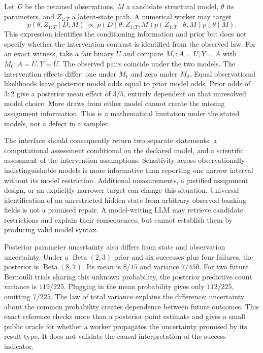 Let $D$ be the retained observations, $M$ a candidate structural model, $\theta$ its parameters, and $Z_{1:T}$ a latent-state path. A numerical worker may target
\[
 p(\theta,Z_{1:T}\mid D,M)
 \ \propto\ p(D\mid\theta,Z_{1:T},M)
 p(Z_{1:T}\mid\theta,M)p(\theta\mid M).
\]
This expression identifies the conditioning information and prior but does not specify whether the intervention contrast is identified from the observed law. For an exact witness, take a fair binary $U$ and compare $M_1:A=U,Y=A$ with $M_0:A=U,Y=U$. The observed pairs coincide under the two models. The intervention effects differ: one under $M_1$ and zero under $M_0$. Equal observational likelihoods leave posterior model odds equal to prior model odds. Prior odds of $3:2$ give a posterior mean effect of $3/5$, entirely dependent on that unresolved model choice. More draws from either model cannot create the missing assignment information. This is a mathematical limitation under the stated models, not a defect in a sampler.~\citep{exec23_pymc_reference,exec25_bsw_choice}

The interface should consequently return two separate statements: a computational assessment conditional on the declared model, and a scientific assessment of the intervention assumptions. Sensitivity across observationally indistinguishable models is more informative than reporting one narrow interval without its model restriction. Additional measurements, a justified assignment design, or an explicitly narrower target can change this situation. Universal identification of an unrestricted hidden state from arbitrary observed banking fields is not a promised repair. A model-writing LLM may retrieve candidate restrictions and explain their consequences, but cannot establish them by producing valid model syntax.~\citep{exec23_numpyro_reference,exec24_bnlearn_contract,exec25_bsw_choice}

Posterior parameter uncertainty also differs from state and observation uncertainty. Under a $\operatorname{Beta}(2,3)$ prior and six successes plus four failures, the posterior is $\operatorname{Beta}(8,7)$. Its mean is $8/15$ and variance $7/450$. For two future Bernoulli trials sharing this unknown probability, the posterior predictive count variance is $119/225$. Plugging in the mean probability gives only $112/225$, omitting $7/225$. The law of total variance explains the difference: uncertainty about the common probability creates dependence between future outcomes. This exact reference checks more than a posterior point estimate and gives a small public oracle for whether a worker propagates the uncertainty promised by its result type. It does not validate the causal interpretation of the success indicator.~\citep{exec25_bsw_choice}

